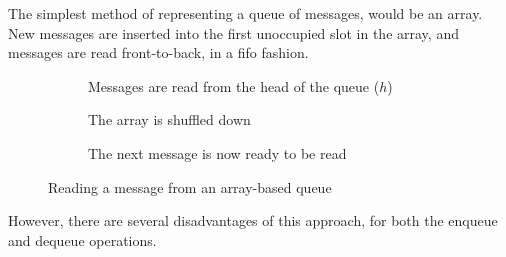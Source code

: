 The simplest method of representing a queue of messages, would be an array. New
messages are inserted into the first unoccupied slot in the array, and messages
are read front-to-back, in a \gls{fifo} fashion.

\begin{figure}[ht]
  \centering
  \begin{subfigure}[b]{\textwidth}
    \centering
    
    \caption{Messages are read from the head of the queue ($h$)}
    \label{fig:tikz:queueArrayInitial}
  \end{subfigure}

  \begin{subfigure}[b]{\textwidth}
    \centering
    
    \caption{The array is shuffled down}
    \label{fig:tikz:queueArrayHeadRead}
  \end{subfigure}

  \begin{subfigure}[b]{\textwidth}
    \centering
    
    \caption{The next message is now ready to be read}
    \label{fig:tikz:queueArrayPostShuffle}
  \end{subfigure}
  \caption{Reading a message from an array-based queue}
  \label{fig:tikz:queueArray}
\end{figure}

However, there are several disadvantages of this approach, for both the enqueue and dequeue operations.

